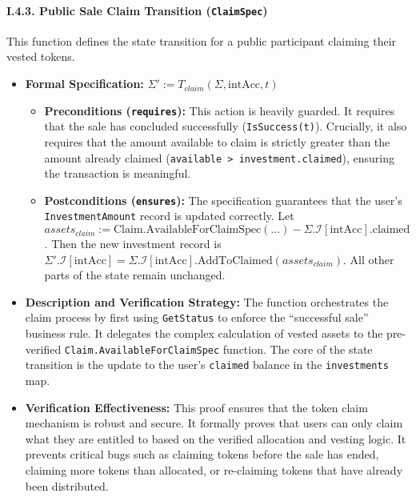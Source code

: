 \documentclass[
  english,
  onecolumn]{article}
\providecommand{\tightlist}{%
  \setlength{\itemsep}{0pt}\setlength{\parskip}{0pt}}
\begin{document}
\paragraph{\texorpdfstring{I.4.3. Public Sale Claim Transition
(\texttt{ClaimSpec})}{I.4.3. Public Sale Claim Transition (ClaimSpec)}}\label{i.4.3.-public-sale-claim-transition-claimspec}

This function defines the state transition for a public participant
claiming their vested tokens.

\begin{itemize}
\tightlist
\item
  \textbf{Formal Specification:}
  \(\Sigma' := T_{claim}(\Sigma, \text{intAcc}, t)\)

  \begin{itemize}
  \tightlist
  \item
    \textbf{Preconditions (\texttt{requires}):} This action is heavily
    guarded. It requires that the sale has concluded successfully
    (\texttt{IsSuccess(t)}). Crucially, it also requires that the amount
    available to claim is strictly greater than the amount already
    claimed (\texttt{available\ \textgreater{}\ investment.claimed}),
    ensuring the transaction is meaningful.
  \item
    \textbf{Postconditions (\texttt{ensures}):} The specification
    guarantees that the user's \texttt{InvestmentAmount} record is
    updated correctly. Let
    \(assets_{claim} := \text{Claim.AvailableForClaimSpec}(...) - \Sigma.\mathcal{I}[\text{intAcc}].\text{claimed}\).
    Then the new investment record is
    \(\Sigma'.\mathcal{I}[\text{intAcc}] = \Sigma.\mathcal{I}[\text{intAcc}].\text{AddToClaimed}(assets_{claim})\).
    All other parts of the state remain unchanged.
  \end{itemize}
\item
  \textbf{Description and Verification Strategy:} The function
  orchestrates the claim process by first using \texttt{GetStatus} to
  enforce the ``successful sale'' business rule. It delegates the
  complex calculation of vested assets to the pre-verified
  \texttt{Claim.AvailableForClaimSpec} function. The core of the state
  transition is the update to the user's \texttt{claimed} balance in the
  \texttt{investments} map.
\item
  \textbf{Verification Effectiveness:} This proof ensures that the token
  claim mechanism is robust and secure. It formally proves that users
  can only claim what they are entitled to based on the verified
  allocation and vesting logic. It prevents critical bugs such as
  claiming tokens before the sale has ended, claiming more tokens than
  allocated, or re-claiming tokens that have already been distributed.
\end{itemize}
\end{document}
